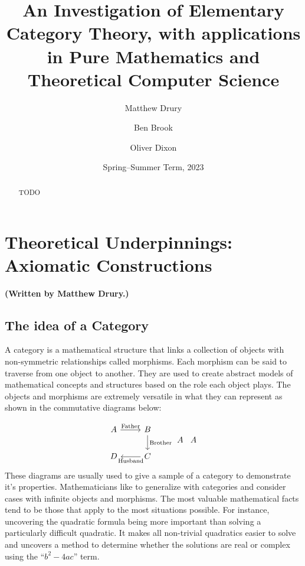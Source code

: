 \documentclass[10pt,a4paper,reqno]{amsart}
\title[An Investigation of Elementary Category Theory]{An Investigation of %
        Elementary Category Theory, with applications in Pure Mathematics and %
        Theoretical Computer Science}
\author{Matthew Drury} \email{\yorkemail{md1499}}
\author{Ben Brook}     \email{\yorkemail{bb1170}}
\author{Oliver Dixon}  \email{\yorkemail{od641}}
\date{Spring--Summer Term, 2023}
\begin{document}
\begin{abstract}
        TODO
\end{abstract}
\maketitle
\tableofcontents
\section{Theoretical %
        Underpinnings: Axiomatic Constructions}
\begin{flushright}
        \textbf{(Written by Matthew Drury.)}
\end{flushright}

\subsection{The idea of a Category}
A category is a mathematical structure that links a collection of objects with
non-symmetric relationships called morphisms.  Each morphism can be said to
traverse from one object to another.  They are used to create abstract models of
mathematical concepts and structures based on the role each object plays. The
objects and morphisms are extremely versatile in what they can represent as
shown in the commutative diagrams below:

\begin{equation}
        \begin{tikzcd}
                A \ar[r,"\text{Father}"] & B \ar[d,"\text{Brother}"] \\
                D & C \ar[l,"\text{Husband}"]
        \end{tikzcd}
        \begin{tikzcd}
        A
        \end{tikzcd}
        \begin{tikzcd}
        A
        \end{tikzcd}
\end{equation}
These diagrams are usually used to give a sample of a category to demonstrate
it's properties.  Mathematicians like to generalize with categories and consider
cases with infinite objects and morphisms.  The most valuable mathematical facts
tend to be those that apply to the most situations possible.  For instance,
uncovering the quadratic formula being more important than solving a
particularly difficult quadratic.  It makes all non-trivial quadratics easier to
solve and uncovers a method to determine whether the solutions are real or
complex using the ``$b^2-4ac$'' term.
\end{document}

